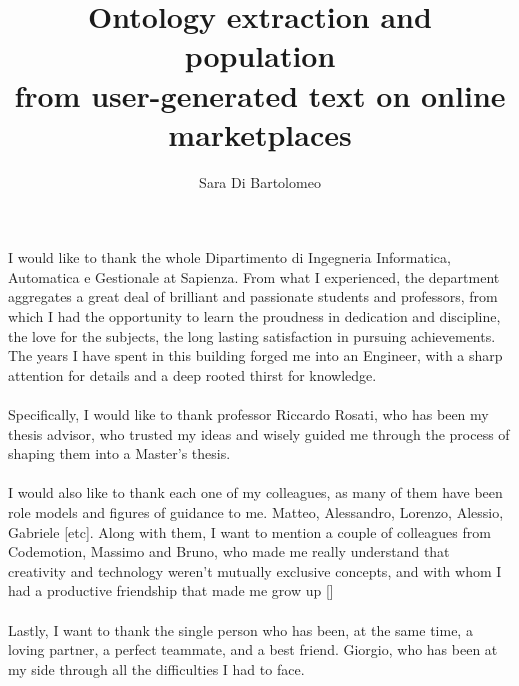 \documentclass[LaM,binding=0.6cm]{sapthesis}
\title{Ontology extraction and population \\ from user-generated text on online marketplaces}
\author{Sara Di Bartolomeo}
\begin{document}
\frontmatter

\maketitle

\dedication{Dedicato a\\ }

\begin{abstract}
\end{abstract}

\begin{acknowledgments}
I would like to thank the whole Dipartimento di Ingegneria Informatica, Automatica e Gestionale at Sapienza. 
From what I experienced, the department aggregates a great deal of brilliant and passionate students and professors, from which I had the opportunity to learn the proudness in dedication and discipline, the love for the subjects, the long lasting satisfaction in pursuing achievements.
The years I have spent in this building forged me into an Engineer, with a sharp attention for details and a deep rooted thirst for knowledge.
\\
\\
Specifically, I would like to thank professor Riccardo Rosati, who has been my thesis advisor, who trusted my ideas and wisely guided me through the process of shaping them into a Master's thesis.
\\
\\
I would also like to thank each one of my colleagues, as many of them have been role models and figures of guidance to me. Matteo, Alessandro, Lorenzo, Alessio, Gabriele [etc]. Along with them, I want to mention a couple of colleagues from Codemotion, Massimo and Bruno, who made me really understand that creativity and technology weren't mutually exclusive concepts, and with whom I had a productive friendship that made me grow up []
\\ 
\\
Lastly, I want to thank the single person who has been, at the same time, a loving partner, a perfect teammate, and a best friend. 
Giorgio, who has been at my side through all the difficulties I had to face. 
\\

\end{acknowledgments}
\end{document}
